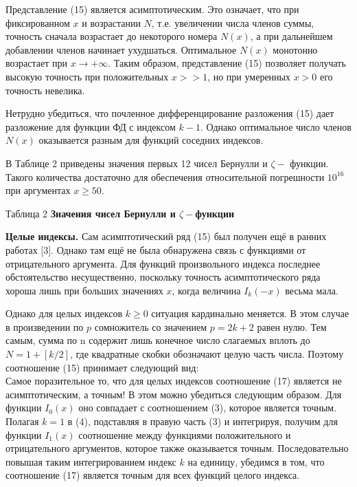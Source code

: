 Представление (15) является асимптотическим. Это означает, что при
фиксированном $x$ и возрастании $N$, т.е. увеличении числа членов суммы,
точность сначала возрастает до некоторого номера $N(x)$, а при дальнейшем
добавлении членов начинает ухудшаться. Оптимальное $N(x)$ монотонно
возрастает при $x \to +\infty$. Таким образом, представление (15) позволяет получать
высокую точность при положительных $x >> 1$, но при умеренных $x > 0$ его
точность невелика.

Нетрудно убедиться, что почленное дифференцирование разложения (15)
дает разложение для функции ФД с индексом $k - 1$. Однако оптимальное
число членов $N(x)$ оказывается разным для функций соседних индексов.

В Таблице 2 приведены значения первых 12 чисел Бернулли и
$\zeta -$ функции. Такого количества достаточно для обеспечения относительной
погрешности $10^{16}$ при аргументах $x \geqslant 50$.

Таблица 2 %
\textbf{Значения чисел Бернулли и $\zeta -$функции}

\textbf{Целые индексы.} Сам асимптотический ряд (15) был получен ещё в ранних
работах [3]. Однако там ещё не была обнаружена связь с функциями от
отрицательного аргумента. Для функций произвольного индекса последнее
обстоятельство несущественно, поскольку точность асимптотического ряда
хороша лишь при больших значениях $x$, когда величина $I_k(-x)$ весьма мала.

Однако для целых индексов $k \geqslant 0$ ситуация кардинально меняется. В этом
случае в произведении по $p$ сомножитель со значением $p = 2k + 2$ равен нулю.
Тем самым, сумма по n содержит лишь конечное число слагаемых вплоть до
$N=1+[k/2]$, где квадратные скобки обозначают целую часть числа. Поэтому
соотношение (15) принимает следующий вид:
\begin{equation}
\end{equation}
Самое поразительное то, что для целых индексов соотношение (17) является не
асимптотическим, а точным! В этом можно убедиться следующим образом. Для
функции $I_0(x)$ оно совпадает с соотношением (3), которое является точным.
Полагая $k=1$ в (4), подставляя в правую часть (3) и интегрируя, получим для
функции $I_1(x)$ соотношение между функциями положительного и
отрицательного аргументов, которое также оказывается точным.
Последовательно повышая таким интегрированием индекс $k$ на единицу,
убедимся в том, что соотношение (17) является точным для всех функций
целого индекса.

